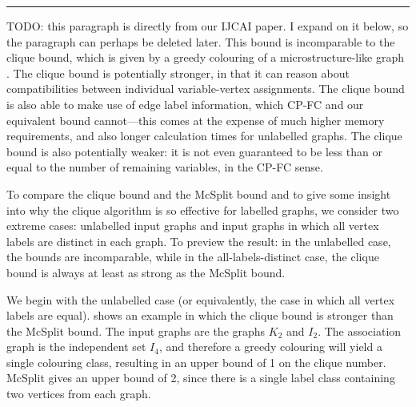 
\hrule

{\color{blue} TODO: this paragraph is directly from our IJCAI paper.  I expand on it
below, so the paragraph can perhaps be deleted later.}
This bound is incomparable to the clique bound, which is given by a greedy
colouring of a microstructure-like graph \citep{DBLP:conf/cp/McCreeshNPS16}.
The clique bound is potentially stronger, in that it can reason about
compatibilities between individual variable-vertex assignments. The clique
bound is also able to make use of edge label information, which CP-FC and our
equivalent bound cannot---this comes at the expense of much higher memory
requirements, and also longer calculation times for unlabelled graphs. The
clique bound is also potentially weaker: it is not even guaranteed to be less
than or equal to the number of remaining variables, in the CP-FC sense.

To compare the clique bound and the McSplit bound and to give some
insight into why the clique algorithm is so effective for labelled
graphs, we consider two extreme
cases: unlabelled input graphs and input graphs in which all vertex labels are
distinct in each graph.  To preview the result: in the unlabelled case,
the bounds are incomparable, while in the all-labels-distinct case,
the clique bound is always at least as strong as the McSplit bound.

We begin with the unlabelled case (or equivalently, the case in which
all vertex labels are equal).   shows
an example in which the clique bound is stronger than the McSplit bound.
The input graphs are the graphs $K_2$ and $I_2$.  The association graph
is the independent set $I_4$, and therefore a greedy colouring will yield
a single colouring class, resulting in an upper bound of 1 on the clique
number.  McSplit gives an upper bound of 2, since there is a single label
class containing two vertices from each graph.


